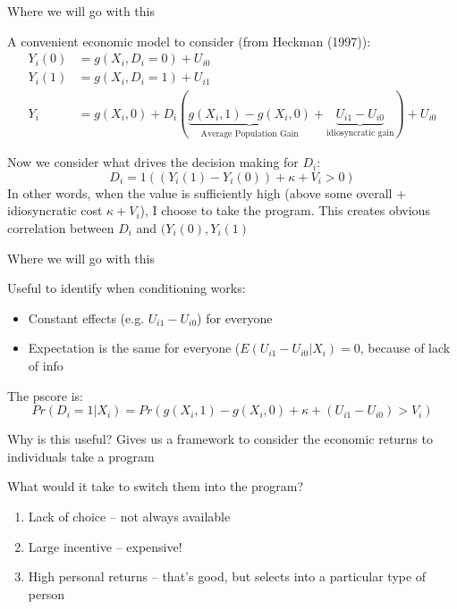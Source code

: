 \documentclass[notes,11pt, aspectratio=169]{beamer}
\newenvironment{wideitemize}{\itemize\addtolength{\itemsep}{10pt}}{\enditemize}
\begin{document}
\begin{frame}{Where we will go with this }
  \begin{wideitemize}
  \item A convenient economic model to consider (from Heckman (1997)):
    \begin{align*}
      Y_{i}(0) &= g(X_{i}, D_{i} = 0) + U_{i0}\\
      Y_{i}(1) &= g(X_{i}, D_{i} = 1) + U_{i1}\\
      Y_{i} &= g(X_{i},0) + D_{i}\left(\underbrace{g(X_{i},1) - g(X_{i},0)}_{\text{Average Population Gain}} + \underbrace{U_{i1} - U_{i0}}_{\text{idiosyncratic gain}}\right) + U_{i0}
    \end{align*}
  \item Now we consider what drives the decision making for $D_{i}$:
    \begin{equation*}
      D_{i} = 1( (Y_{i}(1) - Y_{i}(0))   + \kappa + V_{i}  > 0)
    \end{equation*}
    In other words, when the value is sufficiently high (above some
    overall + idiosyncratic cost $\kappa+V_{i}$), I choose to take the program. This creates obvious correlation between $D_{i}$ and $(Y_{i}(0), Y_{i}(1)$
    \end{wideitemize}
\end{frame}


\begin{frame}{Where we will go with this }
    \begin{wideitemize}
    \item Useful to identify when conditioning works:
      \begin{itemize}
      \item Constant effects (e.g. $U_{i1} - U_{i0}$) for everyone
      \item Expectation is the same for everyone ($E(U_{i1} - U_{i0}| X_{i}) = 0$, because of lack of info
      \end{itemize}
    \item The pscore is:
      \begin{equation*}
        Pr(D_{i} = 1 | X_{i}) = Pr\left(g(X_{i},1) - g(X_{i},0) + \kappa + (U_{i1} - U_{i0}) > V_{i} \right) 
      \end{equation*}
    \item Why is this useful? Gives us a framework to consider the economic returns to individuals take a program
    \item What would it take to switch them into the program?
      \begin{enumerate}
      \item Lack of choice -- not always available
      \item Large incentive -- expensive!
      \item High personal returns -- that's good, but selects into a particular type of person
      \end{enumerate}
    \end{wideitemize}
\end{frame}
\end{document}
